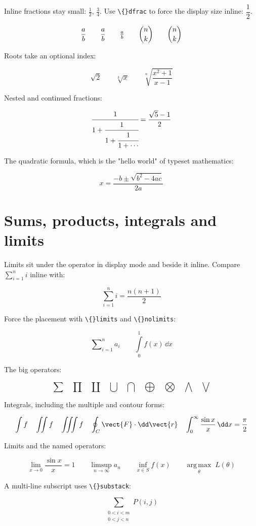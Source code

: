 Inline fractions stay small: $\frac{1}{2}$, $\tfrac{3}{4}$. Use \texttt{\textbackslash\{\}dfrac} to force the display size inline: $\dfrac{1}{2}$.

\[
\frac{a}{b} \qquad \dfrac{a}{b} \qquad \tfrac{a}{b} \qquad \binom{n}{k} \qquad \dbinom{n}{k}
\]

Roots take an optional index:

\[
\sqrt{2} \qquad \sqrt[3]{x} \qquad \sqrt[n]{\frac{x^2 + 1}{x - 1}}
\]

Nested and continued fractions:

\[
\cfrac{1}{1 + \cfrac{1}{1 + \cfrac{1}{1 + \cdots}}} = \frac{\sqrt{5} - 1}{2}
\]

The quadratic formula, which is the "hello world" of typeset mathematics:

\[
x = \frac{-b \pm \sqrt{b^2 - 4ac}}{2a}
\]

\section{Sums, products, integrals and limits}

Limits sit under the operator in display mode and beside it inline. Compare $\sum_{i=1}^{n} i$ inline with:

\[
\sum_{i=1}^{n} i = \frac{n(n+1)}{2}
\]

Force the placement with \texttt{\textbackslash\{\}limits} and \texttt{\textbackslash\{\}nolimits}:

\[
\sum\nolimits_{i=1}^{n} a_i \qquad \int\limits_{0}^{1} f(x)\,\dd x
\]

The big operators:

\[
\sum \quad \prod \quad \coprod \quad \bigcup \quad \bigcap \quad \bigoplus \quad \bigotimes \quad \bigwedge \quad \bigvee
\]

Integrals, including the multiple and contour forms:

\[
\int f \quad \iint f \quad \iiint f \quad \oint_C \vect{F} \cdot \dd\vect{r} \quad \int_0^\infty \frac{\sin x}{x}\,\dd x = \frac{\pi}{2}
\]

Limits and the named operators:

\[
\lim_{x \to 0} \frac{\sin x}{x} = 1 \qquad \limsup_{n \to \infty} a_n \qquad \inf_{x \in S} f(x) \qquad \operatorname*{arg\,max}_{\theta} \; L(\theta)
\]

A multi-line subscript uses \texttt{\textbackslash\{\}substack}:

\[
\sum_{\substack{0 < i < m \\ 0 < j < n}} P(i, j)
\]

